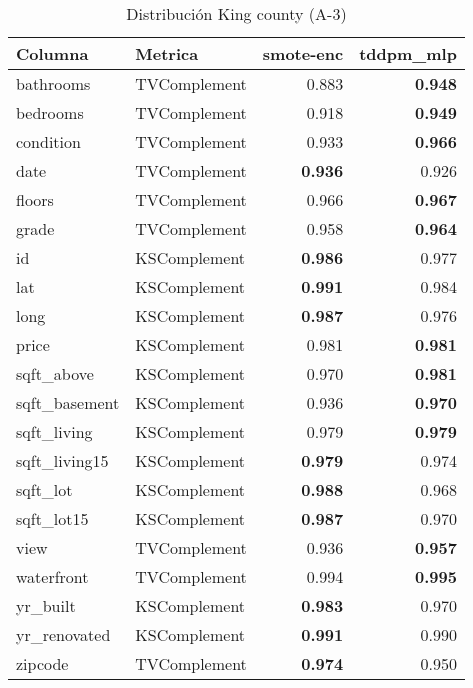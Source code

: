 \begin{table}[H]
\centering
\caption{Distribución King county (A-3)}
\label{table-shape-king county-a-3}
\begin{tabular}{|l|l|r|r|}
\hline
\rowcolor[gray]{0.8}
Columna & Metrica & smote-enc & tddpm\_mlp \\
\hline bathrooms & TVComplement & 0.883 & \bfseries 0.948 \\
\hline bedrooms & TVComplement & 0.918 & \bfseries 0.949 \\
\hline condition & TVComplement & 0.933 & \bfseries 0.966 \\
\hline date & TVComplement & \bfseries 0.936 & 0.926 \\
\hline floors & TVComplement & 0.966 & \bfseries 0.967 \\
\hline grade & TVComplement & 0.958 & \bfseries 0.964 \\
\hline id & KSComplement & \bfseries 0.986 & 0.977 \\
\hline lat & KSComplement & \bfseries 0.991 & 0.984 \\
\hline long & KSComplement & \bfseries 0.987 & 0.976 \\
\hline price & KSComplement & 0.981 & \bfseries 0.981 \\
\hline sqft\_above & KSComplement & 0.970 & \bfseries 0.981 \\
\hline sqft\_basement & KSComplement & 0.936 & \bfseries 0.970 \\
\hline sqft\_living & KSComplement & 0.979 & \bfseries 0.979 \\
\hline sqft\_living15 & KSComplement & \bfseries 0.979 & 0.974 \\
\hline sqft\_lot & KSComplement & \bfseries 0.988 & 0.968 \\
\hline sqft\_lot15 & KSComplement & \bfseries 0.987 & 0.970 \\
\hline view & TVComplement & 0.936 & \bfseries 0.957 \\
\hline waterfront & TVComplement & 0.994 & \bfseries 0.995 \\
\hline yr\_built & KSComplement & \bfseries 0.983 & 0.970 \\
\hline yr\_renovated & KSComplement & \bfseries 0.991 & 0.990 \\
\hline zipcode & TVComplement & \bfseries 0.974 & 0.950 \\
\hline
\end{tabular}
\end{table}
